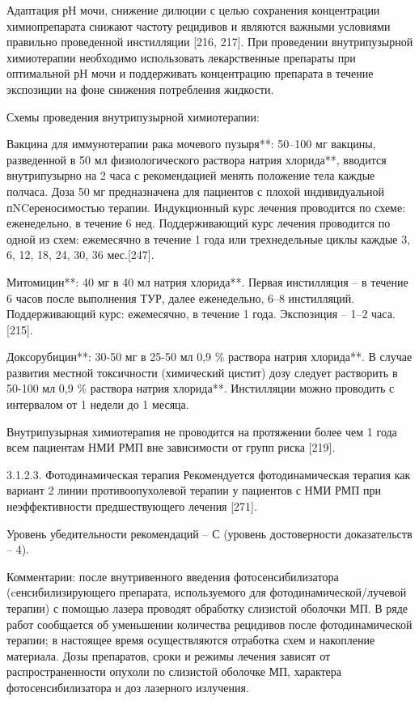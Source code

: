 Адаптация рН мочи, снижение дилюции с целью сохранения концентрации химиопрепарата снижают частоту рецидивов и являются важными условиями правильно проведенной инстилляции [216, 217]. При проведении внутрипузырной химиотерапии необходимо использовать лекарственные препараты при оптимальной рН мочи и поддерживать концентрацию препарата в течение экспозиции на фоне снижения потребления жидкости.

Схемы проведения внутрипузырной химиотерапии:

Вакцина для иммунотерапии рака мочевого пузыря**: 50–100 мг вакцины, разведенной в 50 мл физиологического раствора натрия хлорида**, вводится внутрипузырно на 2 часа с рекомендацией менять положение тела каждые полчаса. Доза 50 мг предназначена для пациентов с плохой индивидуальной пNCереносимостью терапии. Индукционный курс лечения проводится по схеме: еженедельно, в течение 6 нед. Поддерживающий курс лечения проводится по одной из схем: ежемесячно в течение 1 года или трехнедельные циклы каждые 3, 6, 12, 18, 24, 30, 36 мес.[247].

Митомицин**: 40 мг в 40 мл натрия хлорида**. Первая инстилляция – в течение 6 часов после выполнения ТУР, далее еженедельно, 6–8 инстилляций. Поддерживающий курс: ежемесячно, в течение 1 года. Экспозиция – 1–2 часа. [215].

Доксорубицин**: 30-50 мг в 25-50 мл 0,9 \% раствора натрия хлорида**. В случае развития местной токсичности (химический цистит) дозу следует растворить в 50-100 мл 0,9 \% раствора натрия хлорида**. Инстилляции можно проводить с интервалом от 1 недели до 1 месяца.

Внутрипузырная химиотерапия не проводится на протяжении более чем 1 года всем пациентам НМИ РМП вне зависимости от групп риска [219]. 

3.1.2.3. Фотодинамическая терапия
Рекомендуется фотодинамическая терапия как вариант 2 линии противоопухолевой терапии у пациентов с НМИ РМП при неэффективности предшествующего лечения [271].

Уровень убедительности рекомендаций – С (уровень достоверности доказательств – 4).

Комментарии: после внутривенного введения фотосенсибилизатора (cенсибилизирующего препарата, используемого для фотодинамической/лучевой терапии) с помощью лазера проводят обработку слизистой оболочки МП. В ряде работ сообщается об уменьшении количества рецидивов после фотодинамической терапии; в настоящее время осуществляются отработка схем и накопление материала. Дозы препаратов, сроки и режимы лечения зависят от распространенности опухоли по слизистой оболочке МП, характера фотосенсибилизатора и доз лазерного излучения.

